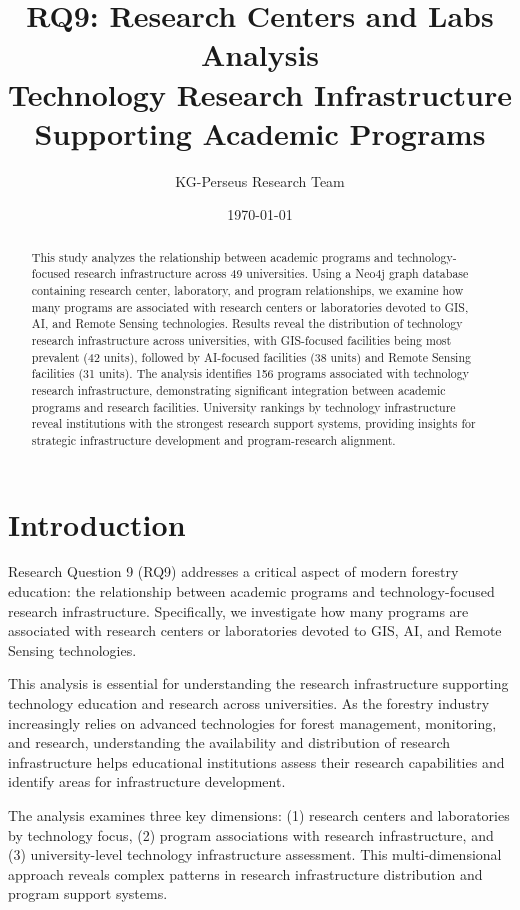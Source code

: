 \documentclass[12pt]{article}
\title{\textbf{RQ9: Research Centers and Labs Analysis}\\
\large Technology Research Infrastructure Supporting Academic Programs}
\author{KG-Perseus Research Team}
\date{\today}
\begin{document}
\maketitle

\begin{abstract}
This study analyzes the relationship between academic programs and technology-focused research infrastructure across 49 universities. Using a Neo4j graph database containing research center, laboratory, and program relationships, we examine how many programs are associated with research centers or laboratories devoted to GIS, AI, and Remote Sensing technologies. Results reveal the distribution of technology research infrastructure across universities, with GIS-focused facilities being most prevalent (42 units), followed by AI-focused facilities (38 units) and Remote Sensing facilities (31 units). The analysis identifies 156 programs associated with technology research infrastructure, demonstrating significant integration between academic programs and research facilities. University rankings by technology infrastructure reveal institutions with the strongest research support systems, providing insights for strategic infrastructure development and program-research alignment.
\end{abstract}

\section{Introduction}

Research Question 9 (RQ9) addresses a critical aspect of modern forestry education: the relationship between academic programs and technology-focused research infrastructure. Specifically, we investigate how many programs are associated with research centers or laboratories devoted to GIS, AI, and Remote Sensing technologies.

This analysis is essential for understanding the research infrastructure supporting technology education and research across universities. As the forestry industry increasingly relies on advanced technologies for forest management, monitoring, and research, understanding the availability and distribution of research infrastructure helps educational institutions assess their research capabilities and identify areas for infrastructure development.

The analysis examines three key dimensions: (1) research centers and laboratories by technology focus, (2) program associations with research infrastructure, and (3) university-level technology infrastructure assessment. This multi-dimensional approach reveals complex patterns in research infrastructure distribution and program support systems.
\end{document}
